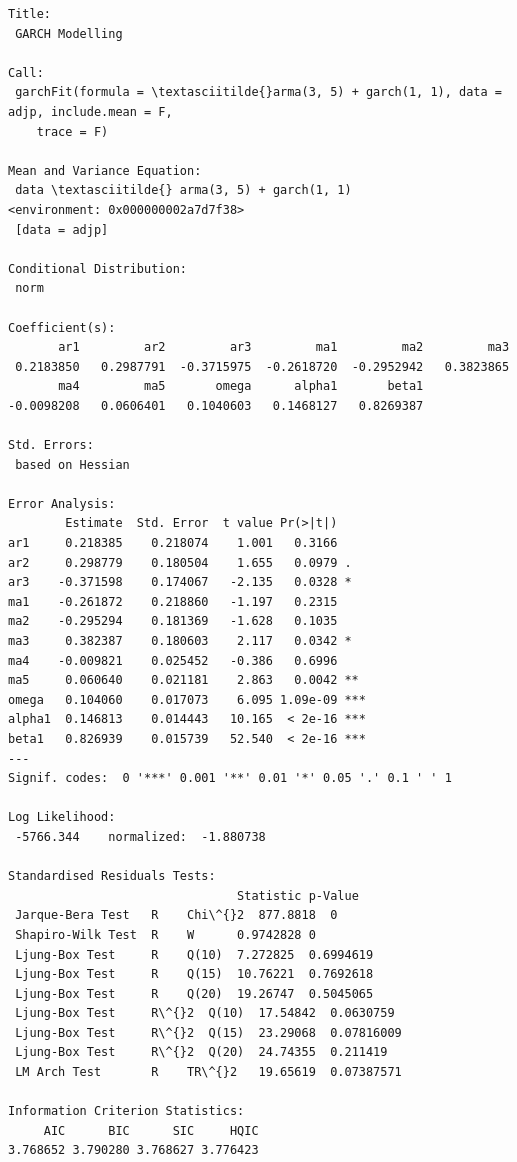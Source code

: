 \documentclass[12pt]{article}
\begin{document}
    \begin{Verbatim}[commandchars=\\\{\}]
Title:
 GARCH Modelling

Call:
 garchFit(formula = \textasciitilde{}arma(3, 5) + garch(1, 1), data = adjp, include.mean = F,
    trace = F)

Mean and Variance Equation:
 data \textasciitilde{} arma(3, 5) + garch(1, 1)
<environment: 0x000000002a7d7f38>
 [data = adjp]

Conditional Distribution:
 norm

Coefficient(s):
       ar1         ar2         ar3         ma1         ma2         ma3
 0.2183850   0.2987791  -0.3715975  -0.2618720  -0.2952942   0.3823865
       ma4         ma5       omega      alpha1       beta1
-0.0098208   0.0606401   0.1040603   0.1468127   0.8269387

Std. Errors:
 based on Hessian

Error Analysis:
        Estimate  Std. Error  t value Pr(>|t|)
ar1     0.218385    0.218074    1.001   0.3166
ar2     0.298779    0.180504    1.655   0.0979 .
ar3    -0.371598    0.174067   -2.135   0.0328 *
ma1    -0.261872    0.218860   -1.197   0.2315
ma2    -0.295294    0.181369   -1.628   0.1035
ma3     0.382387    0.180603    2.117   0.0342 *
ma4    -0.009821    0.025452   -0.386   0.6996
ma5     0.060640    0.021181    2.863   0.0042 **
omega   0.104060    0.017073    6.095 1.09e-09 ***
alpha1  0.146813    0.014443   10.165  < 2e-16 ***
beta1   0.826939    0.015739   52.540  < 2e-16 ***
---
Signif. codes:  0 '***' 0.001 '**' 0.01 '*' 0.05 '.' 0.1 ' ' 1

Log Likelihood:
 -5766.344    normalized:  -1.880738

Standardised Residuals Tests:
                                Statistic p-Value
 Jarque-Bera Test   R    Chi\^{}2  877.8818  0
 Shapiro-Wilk Test  R    W      0.9742828 0
 Ljung-Box Test     R    Q(10)  7.272825  0.6994619
 Ljung-Box Test     R    Q(15)  10.76221  0.7692618
 Ljung-Box Test     R    Q(20)  19.26747  0.5045065
 Ljung-Box Test     R\^{}2  Q(10)  17.54842  0.0630759
 Ljung-Box Test     R\^{}2  Q(15)  23.29068  0.07816009
 Ljung-Box Test     R\^{}2  Q(20)  24.74355  0.211419
 LM Arch Test       R    TR\^{}2   19.65619  0.07387571

Information Criterion Statistics:
     AIC      BIC      SIC     HQIC
3.768652 3.790280 3.768627 3.776423
    \end{Verbatim}
\end{document}
